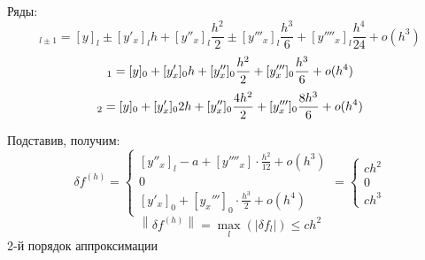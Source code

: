 \documentclass[a4paper, 12pt]{article}
\newcommand{\norm}[1]{\left\lVert#1\right\rVert}
\begin{document}
	Ряды:
	\begin{equation*}
	[y]_{l\pm 1}=[y]_l\pm[y'_x]_lh+[y''_x]_l\frac{h^2}{2}\pm[y'''_x]_l\frac{h^3}{6}+[y''''_x]_l\frac{h^4}{24}+o(h^3)
	\end{equation*}
	\begin{equation*}
	[y]_1=[y]_0+[y'_x]_0 h+[y''_x]_0 \frac{h^2}{2}+[y'''_x]_0\frac{h^3}{6}+o(h^4)\\
	\end{equation*}
	\begin{equation*}
	[y]_2=[y]_0+[y'_x]_0 2h+[y''_x]_0 \frac{4h^2}{2}+[y'''_x]_0\frac{8h^3}{6}+o(h^4)\\
	\end{equation*}
	
	Подставив, получим:
	\begin{equation*}
		\delta f^{(h)}=\begin{cases}
		[y''_x]_l-a+[y''''_x]\cdot\frac{h^2}{12}+o(h^3)\\
		0\\
		[y'_x]_0+[y_x''']_0\cdot\frac{h^3}{2}+o(h^4)
		\end{cases}=
		\begin{cases}
		ch^2\\
		0\\
		ch^3
		\end{cases}
	\end{equation*}
	\begin{equation*}
		\norm{\delta f^{(h)}}=\max_l\left(|\delta f_l|\right)\leqslant ch^2
	\end{equation*}
	2-й порядок аппроксимации
	
\end{document}
